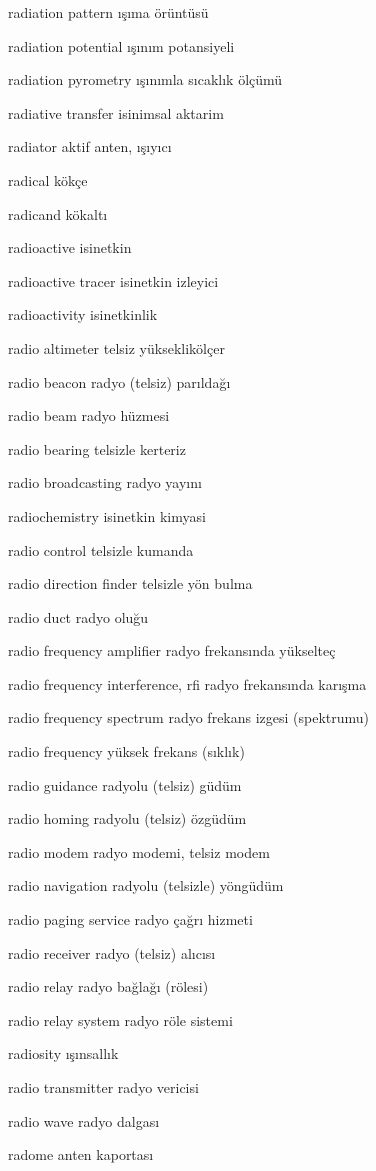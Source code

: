 \documentclass[12pt,fleqn]{article}\usepackage{../../common}
\begin{document}
radiation pattern ışıma örüntüsü

radiation potential ışınım potansiyeli

radiation pyrometry ışınımla sıcaklık ölçümü

radiative transfer isinimsal aktarim

radiator aktif anten, ışıyıcı

radical kökçe

radicand kökaltı

radioactive isinetkin

radioactive tracer isinetkin izleyici

radioactivity isinetkinlik

radio altimeter telsiz yükseklikölçer

radio beacon radyo (telsiz) parıldağı

radio beam radyo hüzmesi

radio bearing telsizle kerteriz

radio broadcasting radyo yayını

radiochemistry isinetkin kimyasi

radio control telsizle kumanda

radio direction finder telsizle yön bulma

radio duct radyo oluğu

radio frequency amplifier radyo frekansında yükselteç

radio frequency interference, rfi radyo frekansında karışma

radio frequency spectrum radyo frekans izgesi (spektrumu)

radio frequency yüksek frekans (sıklık)

radio guidance radyolu (telsiz) güdüm

radio homing radyolu (telsiz) özgüdüm

radio modem radyo modemi, telsiz modem

radio navigation radyolu (telsizle) yöngüdüm

radio paging service radyo çağrı hizmeti

radio receiver radyo (telsiz) alıcısı

radio relay radyo bağlağı (rölesi)

radio relay system radyo röle sistemi

radiosity ışınsallık

radio transmitter radyo vericisi

radio wave radyo dalgası

radome anten kaportası
\end{document}
